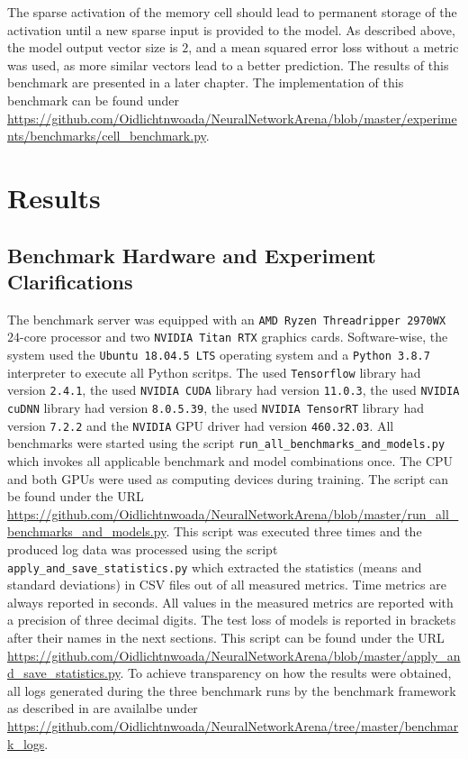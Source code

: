 \documentclass[draft,final]{vutinfth} %
\begin{document}
    The sparse activation of the memory cell should lead to permanent storage of the activation until a new sparse input is provided to the model.
    As described above, the model output vector size is $2$, and a mean squared error loss without a metric was used, as more similar vectors lead to a better prediction.
    The results of this benchmark are presented in a later chapter.
    The implementation of this benchmark can be found under \url{https://github.com/Oidlichtnwoada/NeuralNetworkArena/blob/master/experiments/benchmarks/cell_benchmark.py}.


    \chapter{Results}


    \section{Benchmark Hardware and Experiment Clarifications}
    The benchmark server was equipped with an \texttt{AMD Ryzen Threadripper 2970WX} $24$-core processor and two \texttt{NVIDIA Titan RTX} graphics cards.
    Software-wise, the system used the \texttt{Ubuntu 18.04.5 LTS} operating system and a \texttt{Python 3.8.7} \cite{Python3} interpreter to execute all Python scritps.
    The used \texttt{Tensorflow} \cite{Tensorflow} library had version \texttt{2.4.1}, the used \texttt{NVIDIA CUDA} library had version \texttt{11.0.3}, the used \texttt{NVIDIA cuDNN} library had version \texttt{8.0.5.39}, the used \texttt{NVIDIA TensorRT} library had version \texttt{7.2.2} and the \texttt{NVIDIA} GPU driver had version \texttt{460.32.03}.
    All benchmarks were started using the script \texttt{run\_all\_benchmarks\_and\_models.py} which invokes all applicable benchmark and model combinations once.
    The CPU and both GPUs were used as computing devices during training.
    The script can be found under the URL \url{https://github.com/Oidlichtnwoada/NeuralNetworkArena/blob/master/run_all_benchmarks_and_models.py}.
    This script was executed three times and the produced log data was processed using the script \texttt{apply\_and\_save\_statistics.py} which extracted the statistics (means and standard deviations) in CSV files out of all measured metrics.
    Time metrics are always reported in seconds.
    All values in the measured metrics are reported with a precision of three decimal digits.
    The test loss of models is reported in brackets after their names in the next sections.
    This script can be found under the URL \url{https://github.com/Oidlichtnwoada/NeuralNetworkArena/blob/master/apply_and_save_statistics.py}.
    To achieve transparency on how the results were obtained, all logs generated during the three benchmark runs by the benchmark framework as described in  are availalbe under \url{https://github.com/Oidlichtnwoada/NeuralNetworkArena/tree/master/benchmark_logs}.
\end{document}

